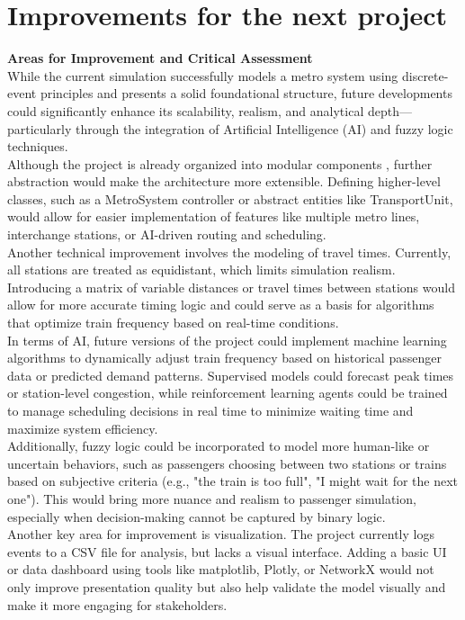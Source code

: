 \chapter{Improvements for the next project}

\noindent\textbf{Areas for Improvement and Critical Assessment}
~\\[0,5cm]

While the current simulation successfully models a metro system using discrete-event principles and presents a solid foundational structure, future developments could significantly enhance its scalability, realism, and analytical depth—particularly through the integration of Artificial Intelligence (AI) and fuzzy logic techniques.
~\\[0,5cm]
Although the project is already organized into modular components , further abstraction would make the architecture more extensible. Defining higher-level classes, such as a MetroSystem controller or abstract entities like TransportUnit, would allow for easier implementation of features like multiple metro lines, interchange stations, or AI-driven routing and scheduling.
~\\[0,5cm]
Another technical improvement involves the modeling of travel times. Currently, all stations are treated as equidistant, which limits simulation realism. Introducing a matrix of variable distances or travel times between stations would allow for more accurate timing logic and could serve as a basis for algorithms that optimize train frequency based on real-time conditions.
~\\[0,5cm]
In terms of AI, future versions of the project could implement machine learning algorithms to dynamically adjust train frequency based on historical passenger data or predicted demand patterns. Supervised models could forecast peak times or station-level congestion, while reinforcement learning agents could be trained to manage scheduling decisions in real time to minimize waiting time and maximize system efficiency.
~\\[0,5cm]
Additionally, fuzzy logic could be incorporated to model more human-like or uncertain behaviors, such as passengers choosing between two stations or trains based on subjective criteria (e.g., "the train is too full", "I might wait for the next one"). This would bring more nuance and realism to passenger simulation, especially when decision-making cannot be captured by binary logic.
~\\[0,5cm]
Another key area for improvement is visualization. The project currently logs events to a CSV file for analysis, but lacks a visual interface. Adding a basic UI or data dashboard using tools like matplotlib, Plotly, or NetworkX would not only improve presentation quality but also help validate the model visually and make it more engaging for stakeholders.
